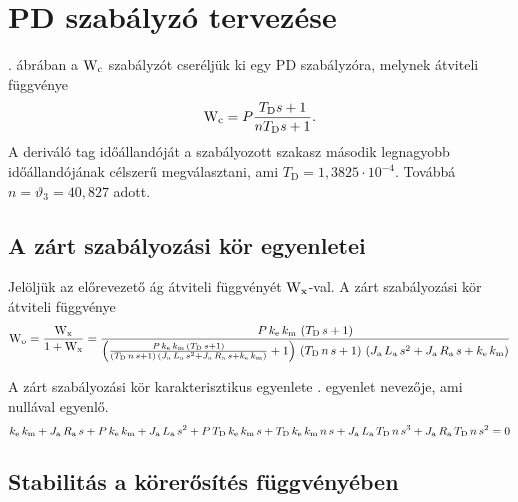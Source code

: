 \section{PD szabályzó tervezése}


. ábrában a $\mathrm{W}_\text{c}$ szabályzót cseréljük ki
egy PD szabályzóra, melynek átviteli függvénye
\begin{equation}
	\mathrm{W}_\text{c} = P\frac{T_\text{D}s+1}{nT_\text{D}s+1}.
\end{equation}
A deriváló tag időállandóját a szabályozott szakasz második legnagyobb időállandójának
célszerű megválasztani, ami $T_\text{D} = 1,3825\cdot 10^{-4}$.
Továbbá $n=\vartheta_3=40,827$ adott.


\subsection{A zárt szabályozási kör egyenletei}

Jelöljük az előrevezető ág átviteli függvényét $\mathrm{W}_\text{x}$-val.
A zárt szabályozási kör átviteli függvénye
\begin{equation}\label{eq:W-x}
	\mathrm{W}_\text{o} = \frac{\mathrm{W}_\text{x}}{1 + \mathrm{W}_\text{x}} =
	\frac{P\, k_\text{e}\, k_\text{m}\, \left(T_\text{D}\, s + 1\right)}{\left(\frac{P\, k_\text{e}\, k_\text{m}\, \left(T_\text{D}\, s + 1\right)}{\left(T_\text{D}\, n\, s + 1\right)\, \left(J_\text{a}\, L_\text{a}\, s^2 + J_\text{a}\, R_\text{a}\, s + k_\text{e}\, k_\text{m}\right)} + 1\right)\, \left(T_\text{D}\, n\, s + 1\right)\, \left(J_\text{a}\, L_\text{a}\, s^2 + J_\text{a}\, R_\text{a}\, s + k_\text{e}\, k_\text{m}\right)}
\end{equation}

A zárt szabályozási kör karakterisztikus egyenlete . egyenlet nevezője,
ami nullával egyenlő.
\begin{equation}
	k_\text{e}\, k_\text{m} + J_\text{a}\, R_\text{a}\, s + P\, k_\text{e}\, k_\text{m} + J_\text{a}\, L_\text{a}\, s^2 + P\, T_\text{D}\, k_\text{e}\, k_\text{m}\, s + T_\text{D}\, k_\text{e}\, k_\text{m}\, n\, s + J_\text{a}\, L_\text{a}\, T_\text{D}\, n\, s^3 + J_\text{a}\, R_\text{a}\, T_\text{D}\, n\, s^2 = 0
\end{equation}

\subsection{Stabilitás a körerősítés függvényében}

